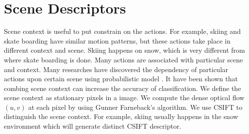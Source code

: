 \documentclass{sig-alternate-05-2015}
\begin{document}
\section{Scene Descriptors}\label{sec:prob}
Scene context is useful to put constrain on the actions.  For example, skiing and skate boarding have similar motion patterns, but these actions take place in different context and scene. Skiing happens
on snow, which is very different from where skate boarding is done\cite{Reddy:2013:RHA:2508580.2508584}. Many actions are associated with particular scene and context. 
Many researches have discovered the dependency of particular actions upon certain scene using probabilistic model \cite{Hoiem2008}. It have been shown that combing scene context can increase the accuracy of classification. 
We define the scene context as stationary pixels in a image. We compute the dense optical flow $(u,v)$ at each pixel by using Gunner Farneback's algorithm\cite{Farneback:2003:TME:1763974.1764031}. 
We use CSIFT\cite{vandeSandeTPAMI2010} to distinguish the scene context. For example, skiing usually happens in the snow environment which will generate distinct CSIFT descriptor.
\end{document}
